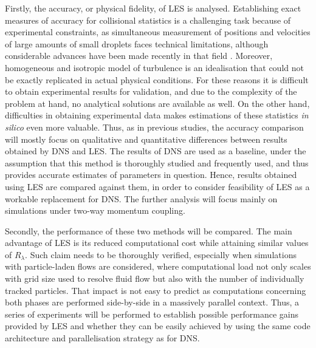 \documentclass{pracamgren}
\begin{document}
Firstly, the accuracy, or physical fidelity, of LES is analysed.
Establishing exact measures of accuracy for collisional statistics is a challenging task because of experimental constraints, as simultaneous measurement of positions and velocities of large amounts of small droplets faces technical limitations, although considerable advances have been made recently in that field \parencite{Yavuz2018}.
Moreover, homogeneous and isotropic model of turbulence is an idealisation that could not be exactly replicated in actual physical conditions.
For these reasons it is difficult to obtain experimental results for validation, and due to the complexity of the problem at hand, no analytical solutions are available as well.
On the other hand, difficulties in obtaining experimental data makes estimations of these statistics \emph{in silico} even more valuable.
Thus, as in previous studies, the accuracy comparison will mostly focus on qualitative and quantitative differences between results obtained by DNS and LES.
The results of DNS are used as a baseline, under the assumption that this method is thoroughly studied and frequently used, and thus provides accurate estimates of parameters in question.
Hence, results obtained using LES are compared against them, in order to consider feasibility of LES as a workable replacement for DNS.
The further analysis will focus mainly on simulations under two-way momentum coupling.

Secondly, the performance of these two methods will be compared.
The main advantage of LES is its reduced computational cost while attaining similar values of $R_{\lambda}$.
Such claim needs to be thoroughly verified, especially when simulations with particle-laden flows are considered, where computational load not only scales with grid size used to resolve fluid flow but also with the number of individually tracked particles.
That impact is not easy to predict as computations concerning both phases are performed side-by-side in a massively parallel context.
Thus, a series of experiments will be performed to establish possible performance gains provided by LES and whether they can be easily achieved by using the same code architecture and parallelisation strategy as for DNS.
\end{document}
